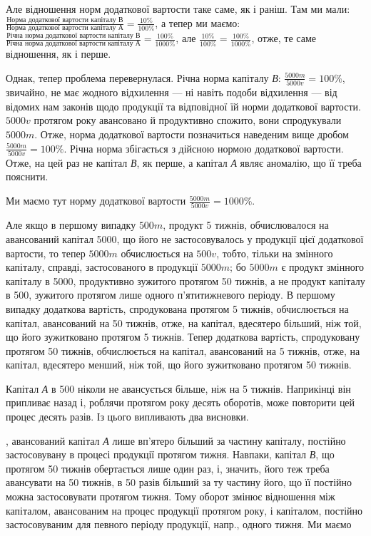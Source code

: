 \parcont{}  %
Але відношення норм додаткової вартости таке саме, як і раніш. Там ми мали:
$\frac{\text{Норма додаткової вартости капіталу }В}{\text{Норма додаткової вартости капіталу }А} =
\frac{10\%}{100\%}
$, а тепер ми маємо:
$\frac{\text{Річна норма додаткової вартости капіталу }В}{\text{Річна норма додаткової вартости капіталу }А} =
\frac{100\%}{1000\%}
$, але $\frac{10\%}{100\%} = \frac{100\%}{ 1000\%}$, отже, те саме відношення, як і перше.

Однак, тепер проблема перевернулася. Річна норма капіталу \emph{В}:
$\frac{5000m}{5000v} = 100\%$, звичайно, не має жодного відхилення — ні навіть
подоби відхилення — від відомих нам законів щодо продукції та відповідної
їй норми додаткової вартости. $5000v$ протягом року авансовано й
продуктивно спожито, вони спродукували $5000m$. Отже, норма додаткової
вартости позначиться наведеним вище дробом $\frac{5000m}{5000v} = 100\%$. Річна
норма збігається з дійсною нормою додаткової вартости. Отже, на цей
раз не капітал \emph{В}, як перше, а капітал \emph{А} являє аномалію, що її треба
пояснити.

Ми маємо тут норму додаткової вартости $\frac{5000m}{5000v} = 1000\%$.

Але якщо в першому випадку $500m$, продукт 5 тижнів, обчислювалося
на авансований капітал 5000, що  його не застосовувалось
у продукції цієї додаткової вартости, то тепер $5000m$ обчислюється на $500v$,
тобто, тільки на  змінного капіталу, справді, застосованого в продукції
$5000m$; бо $5000m$ є продукт змінного капіталу в 5000, продуктивно
зужитого протягом 50 тижнів, а не продукт капіталу в 500,
зужитого протягом лише одного п’ятитижневого періоду. В першому випадку
додаткова вартість, спродукована протягом 5 тижнів, обчислюється
на капітал, авансований на 50 тижнів, отже, на капітал, вдесятеро більший,
ніж той, що його зужитковано протягом 5 тижнів. Тепер додаткова вартість,
спродуковану протягом 50 тижнів, обчислюється на капітал, авансований
на 5 тижнів, отже, на капітал, вдесятеро менший, ніж той, що
його зужитковано протягом 50 тижнів.

Капітал \emph{А} в 500 ніколи не авансується більше, ніж на 5 тижнів.
Наприкінці він припливає назад і, роблячи протягом року десять
оборотів, може повторити цей процес десять разів. Із цього випливають
два висновки.

, авансований капітал \emph{А} лише вп’ятеро більший за частину
капіталу, постійно застосовувану в процесі продукції протягом
тижня. Навпаки, капітал \emph{В}, що протягом 50 тижнів обертається лише
один раз, і, значить, його теж треба авансувати на 50 тижнів, в 50 разів
більший за ту частину його, що її постійно можна застосовувати протягом
тижня. Тому оборот змінює відношення між капіталом, авансованим
на процес продукції протягом року, і капіталом, постійно застосовуваним
для певного періоду продукції, напр., одного тижня. Ми маємо
\parbreak{}  %
